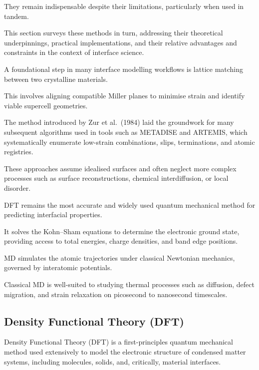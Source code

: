 They remain indispensable despite their limitations, particularly when used in tandem.

This section surveys these methods in turn, addressing their theoretical underpinnings, practical implementations, and
their relative advantages and constraints in the context of interface science.


A foundational step in many interface modelling workflows is lattice matching between two crystalline materials.

This involves aligning compatible Miller planes to minimise strain and identify viable supercell geometries.

The method introduced by Zur et al.~(1984) laid the groundwork for many subsequent algorithms used in tools such as
\textsc{METADISE} and \textsc{ARTEMIS}, which systematically enumerate low-strain combinations, slips, terminations, and
atomic registries.

These approaches assume idealised surfaces and often neglect more complex processes such as surface reconstructions,
chemical interdiffusion, or local disorder.



DFT remains the most accurate and widely used quantum mechanical method for predicting interfacial properties.

It solves the Kohn--Sham equations to determine the electronic ground state, providing access to total energies, charge
densities, and band edge positions.


MD simulates the atomic trajectories under classical Newtonian mechanics, governed by interatomic potentials.

Classical MD is well-suited to studying thermal processes such as diffusion, defect migration, and strain relaxation on
picosecond to nanosecond timescales.


\subsection{Density Functional Theory (DFT)}


Density Functional Theory (DFT) is a first-principles quantum mechanical method used extensively to model the electronic
structure of condensed matter systems, including molecules, solids, and, critically, material interfaces.

